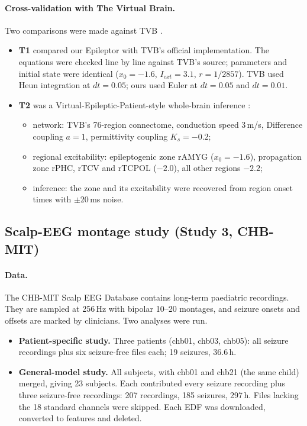 \paragraph{Cross-validation with The Virtual Brain.} Two comparisons were made against TVB \cite{sanzleon2013}.
\begin{itemize}
\item \textbf{T1} compared our Epileptor with TVB's official implementation. The equations were checked line by line against TVB's source; parameters and initial state were identical ($x_0=-1.6$, $I_{ext}=3.1$, $r=1/2857$). TVB used Heun integration at $dt=0.05$; ours used Euler at $dt=0.05$ and $dt=0.01$.
\item \textbf{T2} was a Virtual-Epileptic-Patient-style whole-brain inference \cite{jirsa2017,hashemi2020}:
\begin{itemize}
\item network: TVB's 76-region connectome, conduction speed 3\,m/s, Difference coupling $a=1$, permittivity coupling $K_s=-0.2$;
\item regional excitability: epileptogenic zone rAMYG ($x_0=-1.6$), propagation zone rPHC, rTCV and rTCPOL ($-2.0$), all other regions $-2.2$;
\item inference: the zone and its excitability were recovered from region onset times with $\pm$20\,ms noise.
\end{itemize}
\end{itemize}

\subsection{Scalp-EEG montage study (Study 3, CHB-MIT)}
\label{sec:m-chb}

\paragraph{Data.} The CHB-MIT Scalp EEG Database \cite{shoeb2009,goldberger2000} contains long-term paediatric recordings. They are sampled at 256\,Hz with bipolar 10--20 montages, and seizure onsets and offsets are marked by clinicians. Two analyses were run.
\begin{itemize}
\item \textbf{Patient-specific study.} Three patients (chb01, chb03, chb05): all seizure recordings plus six seizure-free files each; 19 seizures, 36.6\,h.
\item \textbf{General-model study.} All subjects, with chb01 and chb21 (the same child) merged, giving 23 subjects. Each contributed every seizure recording plus three seizure-free recordings: 207 recordings, 185 seizures, 297\,h. Files lacking the 18 standard channels were skipped. Each EDF was downloaded, converted to features and deleted.
\end{itemize}

